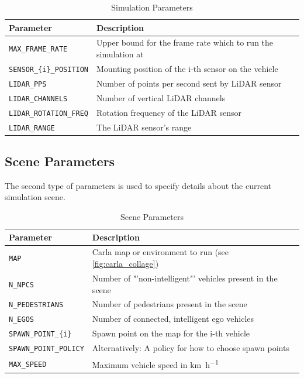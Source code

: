 \begin{table}[H]
	\centering
	\begin{tabular}{|p{7.6cm}|p{7.6cm}|}
		\hline
		\textbf{Parameter} & \textbf{Description} \\ \hline
		\texttt{MAX\_FRAME\_RATE} & Upper bound for the frame rate which to run the simulation at \\ \hline
		\texttt{SENSOR\_\{i\}\_POSITION} & Mounting position of the i-th sensor on the vehicle \\ \hline
		\texttt{LIDAR\_PPS} & Number of points per second sent by LiDAR sensor \\ \hline
		\texttt{LIDAR\_CHANNELS} & Number of vertical LiDAR channels \\ \hline
		\texttt{LIDAR\_ROTATION\_FREQ} & Rotation frequency of the LiDAR sensor \\ \hline
		\texttt{LIDAR\_RANGE} & The LiDAR sensor's range \\ \hline
	\end{tabular}
	\caption{Simulation Parameters}
	\label{tab:simulation_parameters}
\end{table}

\subsection{Scene Parameters}
\label{subsec:implementation:scene_parameters}
The second type of parameters is used to specify details about the current simulation scene.

\begin{table}[H]
	\centering
	\begin{tabular}{|p{7.6cm}|p{7.6cm}|}
		\hline
		\textbf{Parameter} & \textbf{Description} \\ \hline
		\texttt{MAP} & Carla map or environment to run (see \cref{fig:carla_collage}) \\ \hline
		\texttt{N\_NPCS} & Number of "'non-intelligent"' vehicles present in the scene \\ \hline
		\texttt{N\_PEDESTRIANS} & Number of pedestrians present in the scene \\ \hline
		\texttt{N\_EGOS} & Number of connected, intelligent ego vehicles \\ \hline
		\texttt{SPAWN\_POINT\_\{i\}} & Spawn point on the map for the i-th vehicle \\ \hline
		\texttt{SPAWN\_POINT\_POLICY} & Alternatively: A policy for how to choose spawn points \\ \hline
		\texttt{MAX\_SPEED} & Maximum vehicle speed in \si{\km\per\hour} \\ \hline
	\end{tabular}
	\caption{Scene Parameters}
	\label{tab:scene_parameters}
\end{table}

